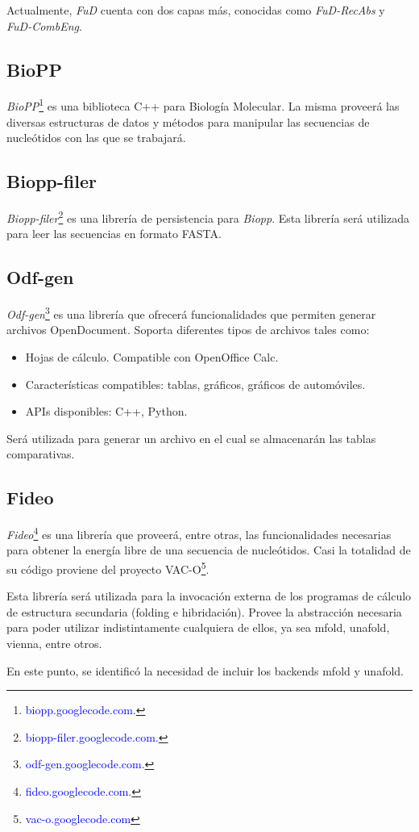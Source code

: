 \documentclass[12pt,a4paper,spanish]{article}
\begin{document}
		\par Actualmente, \emph{FuD} cuenta con dos capas más, conocidas como 
		\emph{FuD-RecAbs} y \emph{FuD-CombEng}.

	\subsection{BioPP}
		\par \textit{BioPP}\footnote{\textcolor{blue}{biopp.googlecode.com.}} es una biblioteca C++ para Biología 			Molecular. La misma proveerá las diversas estructuras de datos y métodos para manipular las secuencias de 			nucleótidos con las que se trabajará. 

	\subsection{Biopp-filer}
		 \par \textit{Biopp-filer}\footnote{\textcolor{blue}{biopp-filer.googlecode.com.}} es una librería de persistencia 			 para \emph{Biopp}. Esta librería será utilizada para leer las secuencias en formato FASTA.  

	\subsection{Odf-gen}
		\textit{Odf-gen}\footnote{\textcolor{blue}{odf-gen.googlecode.com.}} es una librería que ofrecerá funcionalidades 			que permiten generar archivos OpenDocument. Soporta diferentes tipos de archivos tales como:
		\begin{itemize}
			\item Hojas de cálculo. Compatible con OpenOffice Calc.
			\item Características compatibles: tablas, gráficos, gráficos de automóviles.
			\item APIs disponibles: C++, Python.
		\end{itemize}
		 \par Será utilizada para generar un archivo en el cual se almacenarán las tablas comparativas.	
		 
	\subsection{Fideo}
			\textit{Fideo}\footnote{\textcolor{blue}{fideo.googlecode.com.}} es una librería que proveerá, entre otras, 			las funcionalidades necesarias para obtener la energía libre de una secuencia de nucleótidos. Casi la 				totalidad de su código proviene del proyecto VAC-O\footnote{\textcolor{blue}{vac-o.googlecode.com}}.
			\par Esta librería será utilizada para la invocación externa de los programas de cálculo de estructura 				secundaria (folding e hibridación). Provee la abstracción necesaria para poder utilizar indistintamente 			cualquiera de ellos, ya sea mfold, unafold, vienna, entre otros.	
  		    \par En este punto, se identificó la necesidad de incluir los backends mfold\cite{7}\cite{8} y unafold\cite{9}.
\end{document}
